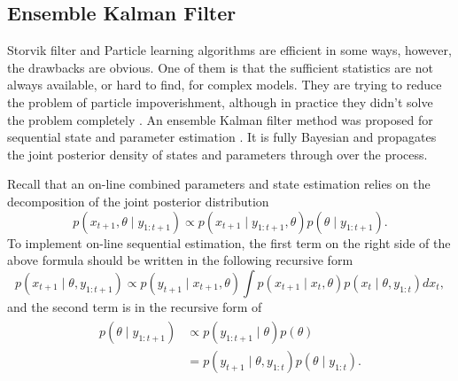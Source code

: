 \subsection{Ensemble Kalman Filter}

Storvik filter and Particle learning algorithms are efficient in some ways,  however, the drawbacks are obvious. One of them is that the sufficient statistics are not always available, or hard to find, for complex models. They are trying to reduce the problem of particle impoverishment, although in practice they didn't solve the problem completely \cite{chopin2010particle}. An ensemble Kalman filter method was proposed for sequential state and parameter estimation \cite{stroud2016bayesian}. It is fully Bayesian and propagates the joint posterior density of states and parameters through over the process. 

Recall that an on-line combined parameters and state estimation relies on the decomposition of the joint posterior distribution 
\begin{equation*}\label{jointposterior}
p(x_{t+1},\theta \mid y_{1:t+1}) \propto p(x_{t+1}\mid y_{1:t+1},\theta)p(\theta\mid y_{1:t+1}).
\end{equation*}
To implement on-line sequential estimation, the first term on the right side of the above formula should be written in the following recursive form 
\begin{equation}\label{jointposteriorterm1}
p(x_{t+1}\mid \theta, y_{1:t+1}) \propto p(y_{t+1}\mid x_{t+1},\theta) \int p(x_{t+1}\mid x_{t},\theta) p(x_{t}\mid \theta, y_{1:t})dx_{t},
\end{equation}
and the second term is in the recursive form of
\begin{align}\label{jointposteriorterm2}
\begin{split}
p(\theta\mid y_{1:t+1}) & \propto p( y_{1:t+1}\mid\theta)p(\theta) \\
&= p(y_{t+1}\mid\theta,y_{1:t})p(\theta\mid y_{1:t}).
\end{split}
\end{align}


